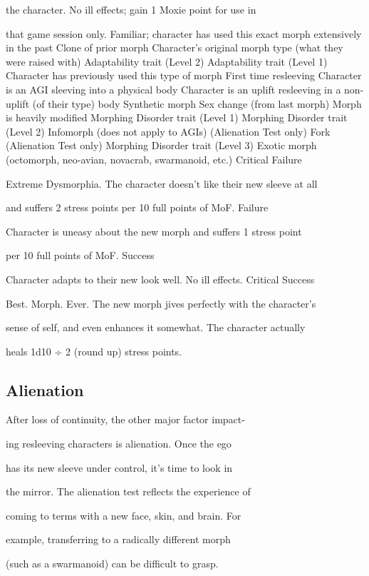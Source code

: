 the character. No ill effects; gain 1 Moxie point for use in 

that game session only.
Familiar; character has used this exact morph extensively in the past
Clone of prior morph
Character's original morph type (what they were raised with)
Adaptability trait (Level 2)
Adaptability trait (Level 1)
Character has previously used this type of morph
First time resleeving
Character is an AGI sleeving into a physical body
Character is an uplift resleeving in a non-uplift (of their type) body
Synthetic morph
Sex change (from last morph)
Morph is heavily modified
Morphing Disorder trait (Level 1)
Morphing Disorder trait (Level 2)
Infomorph (does not apply to AGIs) (Alienation Test only)
Fork (Alienation Test only)
Morphing Disorder trait (Level 3)
Exotic morph (octomorph, neo-avian, novacrab, swarmanoid, etc.)
Critical Failure

Extreme Dysmorphia. The character doesn't like their new sleeve at all 

and suffers 2 stress points per 10 full points of MoF.
Failure

Character is uneasy about the new morph and suffers 1 stress point 

per 10 full points of MoF.
Success

Character adapts to their new look well. No ill effects.
Critical Success

Best. Morph. Ever. The new morph jives perfectly with the character's 

sense of self, and even enhances it somewhat. The character actually 

heals 1d10 ÷ 2 (round up) stress points.

\subsection{Alienation}


After loss of continuity, the other major factor impact-

ing resleeving characters is alienation. Once the ego 

has its new sleeve under control, it's time to look in 

the mirror. The alienation test reflects the experience of 

coming to terms with a new face, skin, and brain. For 

example, transferring to a radically different morph 

(such as a swarmanoid) can be difficult to grasp. 

